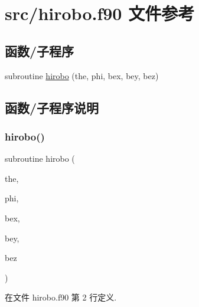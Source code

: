 \hypertarget{hirobo_8f90}{}\section{src/hirobo.f90 文件参考}
\label{hirobo_8f90}
\subsection*{函数/子程序}
\begin{DoxyCompactItemize}
\item 
subroutine \mbox{\hyperlink{hirobo_8f90_a717ccbe1cfc2d8abf8fb9262fa72416f}{hirobo}} (the, phi, bex, bey, bez)
\end{DoxyCompactItemize}


\subsection{函数/子程序说明}
\mbox{\label{hirobo_8f90_a717ccbe1cfc2d8abf8fb9262fa72416f}} 
\subsubsection{\texorpdfstring{hirobo()}{hirobo()}}
{\footnotesize\ttfamily subroutine hirobo (\begin{DoxyParamCaption}\item[{}]{the,  }\item[{}]{phi,  }\item[{}]{bex,  }\item[{}]{bey,  }\item[{}]{bez }\end{DoxyParamCaption})}



在文件 hirobo.\+f90 第 2 行定义.

